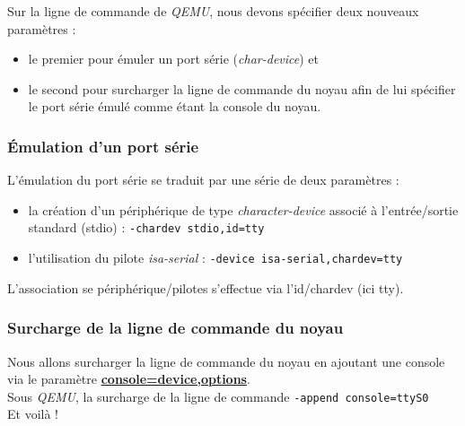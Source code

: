 \documentclass[a4paper]{article}
\begin{document}
Sur la ligne de commande de \textit{QEMU}, nous devons spécifier deux nouveaux paramètres :
\begin{itemize}
\item le premier pour émuler un port série (\textit{char-device}) et
\item le second pour surcharger la ligne de commande du noyau afin de lui spécifier le port série émulé comme étant la console du noyau.
\end{itemize}

\subsubsection{Émulation d'un port série}

L'émulation du port série se traduit par une série de deux paramètres :
\begin{itemize}
\item la création d'un périphérique de type \textit{character-device} associé à l'entrée/sortie standard (stdio) : \lstset{language=sh}\lstinline{-chardev stdio,id=tty}
\item l'utilisation du pilote \textit{isa-serial} : \lstset{language=sh}\lstinline{-device isa-serial,chardev=tty}
\end{itemize}
L'association se périphérique/pilotes s'effectue via l'id/chardev (ici tty).

\subsubsection{Surcharge de la ligne de commande du noyau}

Nous allons surcharger la ligne de commande du noyau en ajoutant une console via le paramètre \href{https://www.kernel.org/doc/Documentation/serial-console.txt}{\textbf{console=device,options}}.\\

Sous \textit{QEMU}, la surcharge de la ligne de commande \lstset{language=sh}\lstinline{-append console=ttyS0}\\

Et voilà !
\end{document}
